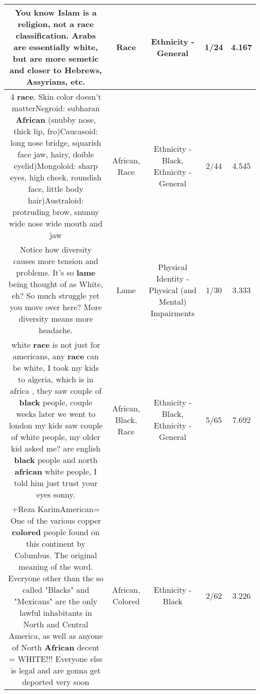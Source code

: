 \documentclass[11pt]{article}
\newlength\mylength
\begin{document}
\begin{center}
\begin{longtable}{|C{.65\mylength}|C{.30\mylength}|C{.12\mylength}|C{.12\mylength}|C{.12\mylength}|}
  \small You know Islam is a religion, not a \textbf{race} classification. Arabs are essentially white, but are more semetic and closer to Hebrews, Assyrians, etc.\normalsize   & Race & Ethnicity - General & 1/24 & 4.167 \\  \hline
  \small 4 \textbf{race}. Skin color doesn't matterNegroid: subharan \textbf{African} (snubby nose, thick lip, fro)Caucasoid: long nose bridge, squarish face jaw, hairy, doible eyelid)Mongoloid: sharp eyes, high cheek, roundish face, little body hair)Australoid: protruding brow, snunny wide nose wide mouth and jaw\normalsize   & African, Race & Ethnicity - Black, Ethnicity - General & 2/44 & 4.545 \\  \hline
  \small Notice how diversity causes more tension and problems. It's so \textbf{lame} being thought of as White, eh? So much struggle yet you move over here? More diversity means more headache.\normalsize   & Lame & Physical Identity - Physical (and Mental) Impairments & 1/30 & 3.333 \\  \hline
  \small white  \textbf{race} is not just for americans, any  \textbf{race} can be  white, I took  my kids to algeria, which is in africa  , they  saw  couple of \textbf{black} people, couple weeks later we went to london my kids  saw  couple of white people, my older  kid asked me? are english \textbf{black} people and  north \textbf{african} white people, I told  him  just trust your eyes sonny.\normalsize   & African, Black, Race & Ethnicity - Black, Ethnicity - General & 5/65 & 7.692 \\  \hline
  \small +Reza KarimAmerican= One of the various copper \textbf{colored} people found on this continent by Columbus. The original meaning of the word. Everyone other than the so called "Blacks" and "Mexicans" are the only lawful inhabitants in North and Central America, as well as anyone of North \textbf{African} decent = WHITE!!! Everyone else is legal and are gonna get deported very soon\normalsize   & African, Colored & Ethnicity - Black & 2/62 & 3.226 \\  \hline

\end{longtable}
\end{center}
\end{document}
